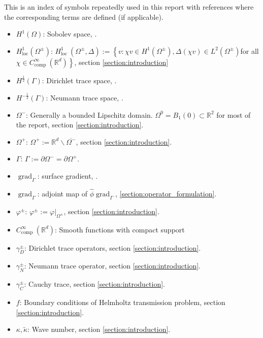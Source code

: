 \documentclass[12pt,journal,compsoc, onecolumn]{IEEEtran}
\begin{document}
This is an index of symbols repeatedly used in this report with references where the corresponding terms are defined (if applicable).
\begin{itemize}
    \item $H^1(\Omega)$: Sobolev space, \cite{hiptmair2012numerical}.
    \item $H_{\mathrm{loc}}^{1}\left(\Omega^{\pm}\right)$:  \(H_{\text {loc }}^{1}\left(\Omega^{\pm}, \Delta\right):=\left\{v: \chi v \in H^{1}\left(\Omega^{\pm}\right), \Delta(\chi v) \in L^{2}\left(\Omega^{\pm}\right)\right.\)for all \(\left.\chi \in C_{\text {comp }}^{\infty}\left(\mathbb{R}^{d}\right)\right\}\), section \ref{section:introduction}
    \item $H^{\frac{1}{2}}(\Gamma)$: Dirichlet trace space, \cite{hiptmair2018advanced}.
    \item $H^{-\frac{1}{2}}(\Gamma)$: Neumann trace space, \cite{hiptmair2018advanced}.
    \item $\Omega^{-}$: Generally a bounded Lipschitz domain.  $\Omega^{0} = B_1(0) \subset \mathbb{R}^2$ for most of the report, section \ref{section:introduction}. 
    \item $\Omega^{+}$: \(\Omega^{+}:=\mathbb{R}^{d} \backslash \overline{\Omega^{-}}\), section \ref{section:introduction}.
    \item $\Gamma$: \(\Gamma:=\partial \Omega^{-}=\partial \Omega^{+}\).
    \item \(\operatorname{grad}_{\Gamma}\): surface gradient, \cite{sauter2010boundary}.
    \item \(\operatorname{grad}_{\Gamma}\): adjoint map of $\hat{\phi} \operatorname{grad}_{\Gamma}$, \ref{section:operator_formulation}.
    \item $\varphi^{\pm}$: \(\varphi^{\pm}:=\left.\varphi\right|_{\Omega^{\pm}}\), section \ref{section:introduction}.
    \item $C_{\text {comp }}^{\infty}\left(\mathbb{R}^{d}\right)$: Smooth functions with compact support
    \item $\gamma_{D}^{\pm}$: Dirichlet trace operators, section \ref{section:introduction}.
    \item $\gamma_{N}^{\pm}$: Neumann trace operator, section \ref{section:introduction}.
    \item \(\gamma_{C}^{\pm}\): Cauchy trace, section \ref{section:introduction}.
    \item $f$: Boundary conditions of Helmholtz transmission problem, section \ref{section:introduction}.
    \item $\kappa, \tilde \kappa$: Wave number, section \ref{section:introduction}.

\end{itemize}
\end{document}
